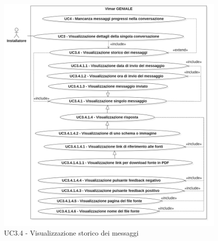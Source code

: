 \begin{figure}[H]
\centering
\includegraphics[width=1\textwidth]{contents/casi_duso/png/UC3.4.png}
\caption{UC3.4 - Visualizzazione storico dei messaggi}
\end{figure}

